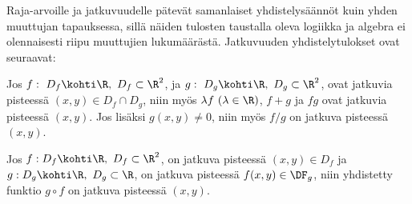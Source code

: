Raja-arvoille ja jatkuvuudelle pätevät samanlaiset yhdistelysäännöt kuin yhden muuttujan 
tapauksessa, sillä näiden tulosten taustalla oleva logiikka ja algebra ei olennaisesti riipu 
muuttujien lukumäärästä. Jatkuvuuden yhdistelytulokset ovat seuraavat:
%
\begin{Lause} \label{yhdistelylause 1} Jos $f:\ D_f \kohti \R,\ D_f \subset \R^2$, ja
$g:\ D_g \kohti \R,\ D_g \subset \R^2$, ovat jatkuvia pisteessä $(x,y) \in D_f \cap D_g$, niin 
myös $\lambda f\ (\lambda \in \R)$, $f+g$ ja $fg$ ovat jatkuvia pisteessä $(x,y)$. Jos lisäksi
$g(x,y) \neq 0$, niin myös $f/g$ on jatkuva pisteessä $(x,y)$. 
\end{Lause}
\begin{Lause} \label{yhdistelylause 2} Jos $f: D_f \kohti \R,\ D_f \subset \R^2$, on jatkuva 
pisteessä $(x,y) \in D_f$ ja $g: D_g \kohti \R,\ D_g \subset \R$, on jatkuva pisteessä
$f(x,y)\in\DF_g$, niin yhdistetty funktio $g \circ f$ on jatkuva pisteessä $(x,y)$. 
\end{Lause}


